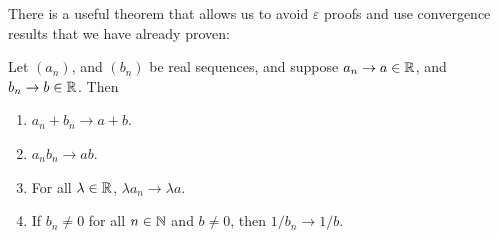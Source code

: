\documentclass[../analysis1.tex]{subfiles}
\begin{document}
There is a useful theorem that allows us to avoid $\varepsilon$ proofs and use convergence results that we have already proven:
\begin{theorem}
\label{thm:alt}
    \begin{shaded*}
        Let $(a_n)$, and $(b_n)$ be real sequences, and suppose $a_n\to a\in\mathbb{R}$, and $b_n\to b\in \mathbb{R}$. Then
        \begin{enumerate}
            \item[1.] $a_n+b_n\to a+b$.
            \item[2.] $a_nb_n\to ab$.
            \item[3.] For all $\lambda\in \mathbb{R}$, $\lambda a_n\to \lambda a$. 
            \item[4.] If $b_n\ne 0$ for all $n\in\mathbb{N}$ and $b\ne 0$, then $1/b_n\to 1/b$. 
        \end{enumerate}
    \end{shaded*}
\end{theorem}
\end{document}
